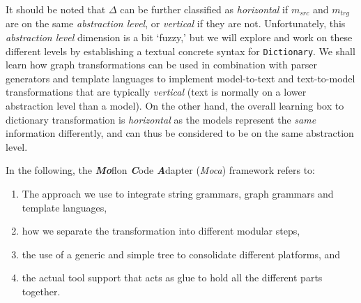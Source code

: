 \newpage

It should be noted that $\Delta$ can be further classified as \emph{horizontal} if $m_{src}$ and $m_{trg}$ are on the same
\emph{abstraction level}, or \emph{vertical} if they are not. Unfortunately, this \emph{abstraction level} dimension is a bit `fuzzy,' but we will explore and
work on these different levels by establishing a textual concrete syntax for \texttt{Dictionary}. We shall learn how graph transformations can be used in
combination with parser generators and template languages to implement model-to-text and text-to-model transformations that are typically \emph{vertical} (text
is normally on a lower abstraction level than a model). On the other hand, the overall learning box to dictionary transformation is \emph{horizontal} as the
models represent the \emph{same} information differently, and can thus be considered to be on the same abstraction level.

In the following, the \emph{\bf Mo}flon \emph{\bf C}ode \emph{\bf A}dapter (\emph{Moca}) framework refers to:
\begin{enumerate}

 \item The approach we use to integrate string grammars, graph grammars and template languages, 

 \item how we separate the transformation into different modular steps, 

 \item the use of a generic and simple tree to consolidate different platforms, and 

 \item the actual tool support that acts as glue to hold all the different parts together.

\end{enumerate}



